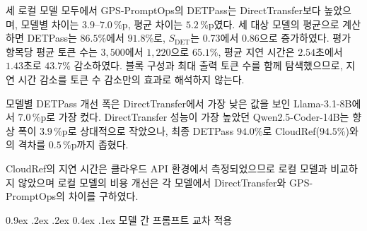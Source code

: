 \documentclass[10pt,twocolumn]{article}
\makeatletter
\newcommand{\sdet}{\ensuremath{S_{\mathrm{DET}}}}
\renewcommand{\subsection}{\@startsection{subsection}{2}{\z@}%
{0.9ex \@plus .2ex \@minus .2ex}%
{0.4ex \@plus .1ex}%
{\normalfont\normalsize\bfseries}}
\makeatother
\begin{document}
세 로컬 모델 모두에서 GPS-PromptOps의 DETPass는 DirectTransfer보다 높았으며, 모델별 차이는 $3.9$--$7.0$\,\%p, 평균 차이는 $5.2$\,\%p였다. 세 대상 모델의 평균으로 계산하면 DETPass는 $86.5\%$에서 $91.8\%$로, \sdet{}는 0.73에서 0.86으로 증가하였다. 평가 항목당 평균 토큰 수는 $3{,}500$에서 $1{,}220$으로 $65.1\%$, 평균 지연 시간은 $2.54$초에서 $1.43$초로 $43.7\%$ 감소하였다. 블록 구성과 최대 출력 토큰 수를 함께 탐색했으므로, 지연 시간 감소를 토큰 수 감소만의 효과로 해석하지 않는다.

모델별 DETPass 개선 폭은 DirectTransfer에서 가장 낮은 값을 보인 Llama-3.1-8B에서 $7.0$\,\%p로 가장 컸다. DirectTransfer 성능이 가장 높았던 Qwen2.5-Coder-14B는 향상 폭이 $3.9$\,\%p로 상대적으로 작았으나, 최종 DETPass $94.0\%$로 CloudRef($94.5\%$)와의 격차를 $0.5$\,\%p까지 좁혔다.

CloudRef의 지연 시간은 클라우드 API 환경에서 측정되었으므로 로컬 모델과 비교하지 않았으며 로컬 모델의 비용 개선은 각 모델에서 DirectTransfer와 GPS-PromptOps의 차이를 구하였다.

\subsection{모델 간 프롬프트 교차 적용}
\end{document}
